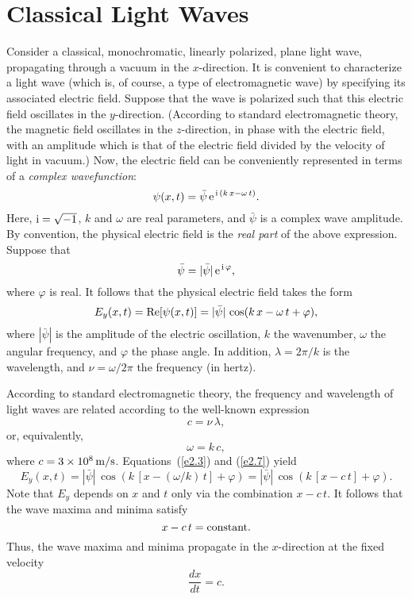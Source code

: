 \section{Classical Light Waves}\label{s2.2}
Consider a classical, monochromatic, linearly polarized, plane light wave,
propagating through a vacuum in the $x$-direction. It is convenient to characterize a light wave
(which is, of course, a type of electromagnetic wave) by specifying its associated 
electric field. Suppose that the wave is polarized such that this
 electric field oscillates in the $y$-direction. (According to standard
electromagnetic theory, the  magnetic field oscillates in the $z$-direction, in phase with the electric field, with an amplitude which is that of the electric field  divided by the
velocity of light in vacuum.) Now, the
 electric field can be conveniently represented in terms of a {\em complex wavefunction}:
\begin{equation}\label{e2.1}
\psi (x,t) = \bar{\psi}\,{\rm e}^{\,{\rm i}\,(k\,x-\omega\,t)}.
\end{equation}
Here, ${\rm i} = \sqrt{-1}$, $k$ and $\omega$ are real parameters, and $\bar{\psi}$ is a complex wave amplitude. By convention, the
physical electric field is the {\em real part}\/ of the above expression.
Suppose that 
\begin{equation}\label{e2.2}
\bar{\psi} = |\bar{\psi}|\,{\rm e}^{\,{\rm i}\,\varphi},
\end{equation}
where $\varphi$ is real. It follows that the physical electric field
takes the form
\begin{equation}\label{e2.3}
E_y(x,t) = {\rm Re}[\psi(x,t)] = |\bar{\psi}|\,\cos(k\,x-\omega\,t +\varphi),
\end{equation}
where $|\bar{\psi}|$ is the amplitude of the electric oscillation, $k$ the wavenumber, $\omega$ the
angular frequency, and $\varphi$ the phase angle. In addition, $\lambda=2\pi/k$ is the wavelength, and
$\nu=\omega/2\pi$ the frequency (in hertz). 

According to  standard electromagnetic theory,  the frequency and wavelength of light waves are related according to
the well-known expression
\begin{equation}
c = \nu\,\lambda,
\end{equation}
or, equivalently, 
\begin{equation}\label{e2.7}
\omega = k\,c,
\end{equation}
where $c=3\times 10^8\,{\rm m/s}$. 
Equations~(\ref{e2.3}) and (\ref{e2.7}) yield 
\begin{equation}\label{e2.8}
E_y(x,t) =|\bar{\psi}|\,\cos\left(k\,[x-(\omega/k)\,t]+\varphi\right)= |\bar{\psi}|\,\cos\left(k\,[x-c\,t]+\varphi\right).
\end{equation}
Note that $E_y$ depends on $x$ and $t$ only via the
combination $x-c\,t$. It follows that the wave maxima and minima satisfy
\begin{equation}
x - c\, t = {\rm constant}.
\end{equation}
Thus, the wave maxima and minima  propagate in the $x$-direction at the fixed velocity
\begin{equation}\label{e2.7a}
\frac{dx}{dt} = c.
\end{equation}


